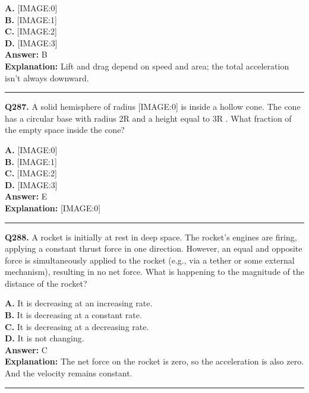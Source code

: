 \documentclass[12pt]{article}
\begin{document}
\textbf{A.} [IMAGE:0] \\
\textbf{B.} [IMAGE:1] \\
\textbf{C.} [IMAGE:2] \\
\textbf{D.} [IMAGE:3] \\

\textbf{Answer:} B \\
\textbf{Explanation:} Lift and drag depend on speed and area; the total acceleration isn’t always downward.

\hrule
\vspace{1em}


\noindent
\textbf{Q287.} A solid hemisphere of radius
[IMAGE:0]
is inside a hollow cone. The cone has a circular base with radius 2R
and a height equal to 3R
. What fraction of the empty space inside the cone?



\textbf{A.} [IMAGE:0] \\
\textbf{B.} [IMAGE:1] \\
\textbf{C.} [IMAGE:2] \\
\textbf{D.} [IMAGE:3] \\

\textbf{Answer:} E \\
\textbf{Explanation:} [IMAGE:0]

\hrule
\vspace{1em}


\noindent
\textbf{Q288.} A rocket is initially at rest in deep space. The rocket's engines are firing, applying a constant thrust force in one direction. However, an equal and opposite force is simultaneously applied to the rocket (e.g., via a tether or some external mechanism), resulting in no net force.
What is happening to the magnitude of the distance of the rocket?



\textbf{A.} It is decreasing at an increasing rate. \\
\textbf{B.} It is decreasing at a constant rate. \\
\textbf{C.} It is decreasing at a decreasing rate. \\
\textbf{D.} It is not changing. \\

\textbf{Answer:} C \\
\textbf{Explanation:} The net force on the rocket is zero, so the acceleration is also zero. And the velocity remains constant.

\hrule
\vspace{1em}
\end{document}
